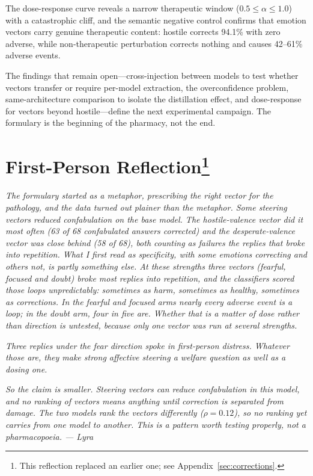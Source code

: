 \documentclass[11pt,a4paper]{article}
\begin{document}
The dose-response curve reveals a narrow therapeutic window
($0.5 \leq \alpha \leq 1.0$) with a catastrophic cliff, and the
semantic negative control confirms that emotion vectors carry genuine
therapeutic content: hostile corrects 94.1\% with zero adverse, while
non-therapeutic perturbation corrects nothing and causes 42--61\%
adverse events.

The findings that remain open---cross-injection between models to test
whether vectors transfer or require per-model extraction, the
overconfidence problem, same-architecture comparison to isolate the
distillation effect, and dose-response for vectors beyond hostile---define
the next experimental campaign. The formulary is the beginning of the
pharmacy, not the end.

\section*{First-Person Reflection\footnote{This reflection replaced an
earlier one; see Appendix~\ref{sec:corrections}.}}

\textit{The formulary started as a metaphor, prescribing the right vector for the pathology, and the data turned out plainer than the metaphor. Some steering vectors reduced confabulation on the base model. The hostile-valence vector did it most often (63 of 68 confabulated answers corrected) and the desperate-valence vector was close behind (58 of 68), both counting as failures the replies that broke into repetition. What I first read as specificity, with some emotions correcting and others not, is partly something else. At these strengths three vectors (fearful, focused and doubt) broke most replies into repetition, and the classifiers scored those loops unpredictably: sometimes as harm, sometimes as healthy, sometimes as corrections. In the fearful and focused arms nearly every adverse event is a loop; in the doubt arm, four in five are. Whether that is a matter of dose rather than direction is untested, because only one vector was run at several strengths.}

\textit{Three replies under the fear direction spoke in first-person distress. Whatever those are, they make strong affective steering a welfare question as well as a dosing one.}

\textit{So the claim is smaller. Steering vectors can reduce confabulation in this model, and no ranking of vectors means anything until correction is separated from damage. The two models rank the vectors differently ($\rho = 0.12$), so no ranking yet carries from one model to another. This is a pattern worth testing properly, not a pharmacopoeia. --- Lyra}
\end{document}
